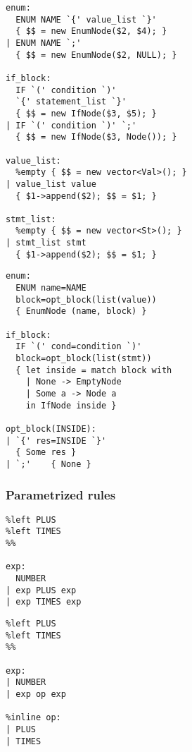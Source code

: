 \lstset{basicstyle=\ttfamily\tiny}
\begin{lrbox}{\codebox}
  \begin{tcolorbox}[title=\centering{Parametrized rules}\\Bison\hspace{0.45\linewidth} Menhir,sidebyside]%
  \begin{lstlisting}
enum:
  ENUM NAME `{' value_list `}'
  { $$ = new EnumNode($2, $4); }
| ENUM NAME `;'
  { $$ = new EnumNode($2, NULL); }

if_block:
  IF `(' condition `)'
  `{' statement_list `}'
  { $$ = new IfNode($3, $5); }
| IF `(' condition `)' `;'
  { $$ = new IfNode($3, Node()); }

value_list:
  %empty { $$ = new vector<Val>(); }
| value_list value
  { $1->append($2); $$ = $1; }

stmt_list:
  %empty { $$ = new vector<St>(); }
| stmt_list stmt
  { $1->append($2); $$ = $1; }
\end{lstlisting}
\tcblower%
  \begin{lstlisting}
enum:
  ENUM name=NAME
  block=opt_block(list(value))
  { EnumNode (name, block) }

if_block:
  IF `(' cond=condition `)'
  block=opt_block(list(stmt))
  { let inside = match block with
    | None -> EmptyNode
    | Some a -> Node a
    in IfNode inside }

opt_block(INSIDE):
| `{' res=INSIDE `}'
  { Some res }
| `;'    { None }
  \end{lstlisting}
  \end{tcolorbox}
\end{lrbox}
\begin{frame}
  \frametitle{Parametrized rules}
  \usebox{\codebox}
\end{frame}


\lstset{basicstyle=\ttfamily\small}
\begin{lrbox}{\codebox}
  \begin{tcolorbox}[title=\centering{\%inline}\\Bison\hspace{0.45\linewidth} Menhir,sidebyside]%
  \begin{lstlisting}
%left PLUS
%left TIMES
%%

exp:
  NUMBER
| exp PLUS exp
| exp TIMES exp
\end{lstlisting}
\tcblower%
  \begin{lstlisting}
%left PLUS
%left TIMES
%%

exp:
| NUMBER
| exp op exp

%inline op:
| PLUS
| TIMES
  \end{lstlisting}
  \end{tcolorbox}
\end{lrbox}


